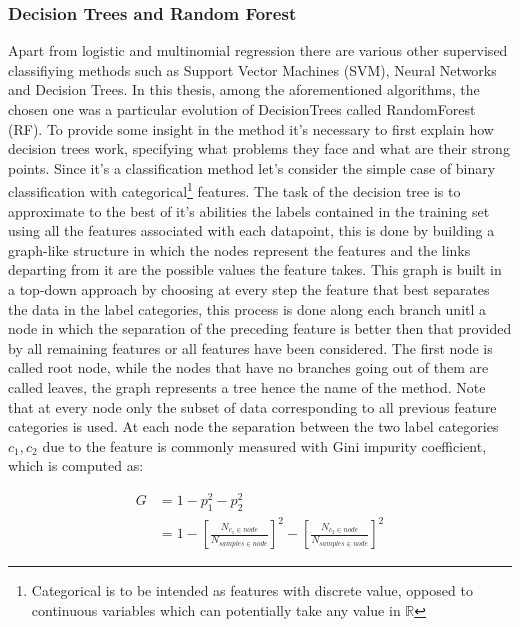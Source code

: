 \subsubsection{Decision Trees and Random Forest}
Apart from logistic and multinomial regression there are various other supervised classifiying methods such as Support Vector Machines (SVM), Neural Networks and Decision Trees. In this thesis, among the aforementioned algorithms, the chosen one was a particular evolution of DecisionTrees called RandomForest (RF).
To provide some insight in the method it's necessary to first explain how decision trees work, specifying what problems they face and what are their strong points.
Since it's a classification method let's consider the simple case of binary classification with categorical\footnote{Categorical is to be intended as features with discrete value, opposed to continuous variables which can potentially take any value in $\mathbb{R}$} features. The task of the decision tree is to approximate to the best of it's abilities the labels contained in the training set using all the features associated with each datapoint, this is done by building a graph-like structure in which the nodes represent the features and the links departing from it are the possible values the feature takes. This graph is built in a top-down approach by choosing at every step the feature that best separates the data in the label categories, this process is done along each branch unitl a node in which the separation of the preceding feature is better then that provided by all remaining features or all features have been considered. The first node is called root node, while the nodes that have no branches going out of them are called leaves, the graph represents a tree hence the name of the method. Note that at every node only the subset of data corresponding to all previous feature categories is used. 
At each node the separation between the two label categories $c_1, c_2$ due to the feature is commonly measured with Gini impurity coefficient, which is computed as:

\begin{equation}
	\begin{split}
		G &= 1 - p^2_1 -p^2_2 \\
		   &= 1 - \left[ \frac{N_{c_1\in node}}{N_{samples\in node} } \right]^2 - \left[\frac{N_{c_2\in node}}{N_{samples\in node}} \right]^2
	\end{split}
\end{equation}

